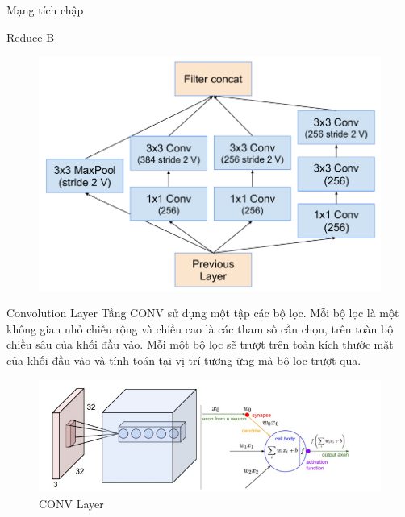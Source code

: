 \documentclass[compress]{beamer}
\begin{document}
\begin{frame}{Mạng tích chập}
\begin{frame}{Reduce-B}
\begin{figure}[H]
\includegraphics[scale=0.3]{reduceB.png}
\end{figure}
\end{frame}


\end{frame}
\begin{frame}{Convolution Layer}
Tầng CONV sử dụng một tập các bộ lọc. Mỗi bộ lọc là một không gian nhỏ chiều rộng và chiều cao là các tham số cần chọn, trên toàn bộ chiều sâu của khối đầu vào. Mỗi một bộ lọc sẽ trượt trên toàn kích thước mặt của khối đầu vào và tính toán tại vị trí tương ứng mà bộ lọc trượt qua.
\begin{figure}[H]
\includegraphics[scale=0.5]{img2.png}
\caption{CONV Layer}
\end{figure}

\end{frame}
\end{document}
